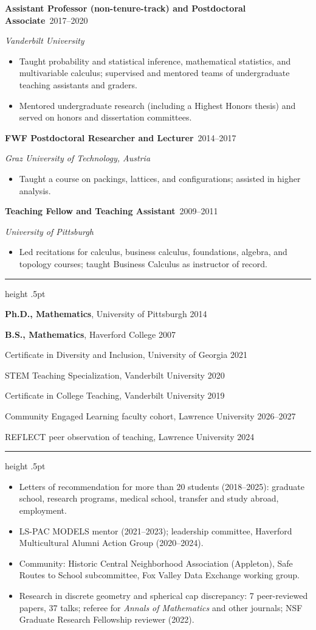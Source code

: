 \documentclass[11pt]{article}
\newcommand{\sect}[1]{\par\vspace{7pt}{\large\bfseries #1}\par\vspace{1pt}%
  {\color{rule}\hrule height .5pt}\vspace{4pt}}
\newcommand{\role}[3]{\par\vspace{3pt}\textbf{#1}\ \hfill\mbox{#3}\par   %
  {\itshape #2}\par}
\begin{document}
\role{Assistant Professor (non-tenure-track) and Postdoctoral Associate}{Vanderbilt University}{2017--2020}
\begin{itemize}
  \item Taught probability and statistical inference, mathematical statistics, and multivariable calculus;
        supervised and mentored teams of undergraduate teaching assistants and graders.
  \item Mentored undergraduate research (including a Highest Honors thesis) and served on honors and
        dissertation committees.
\end{itemize}
\role{FWF Postdoctoral Researcher and Lecturer}{Graz University of Technology, Austria}{2014--2017}
\begin{itemize}
  \item Taught a course on packings, lattices, and configurations; assisted in higher analysis.
\end{itemize}
\role{Teaching Fellow and Teaching Assistant}{University of Pittsburgh}{2009--2011}
\begin{itemize}
  \item Led recitations for calculus, business calculus, foundations, algebra, and topology courses; taught
        Business Calculus as instructor of record.
\end{itemize}

\sect{Education and Certificates}
\textbf{Ph.D., Mathematics}, University of Pittsburgh \hfill 2014\par
\textbf{B.S., Mathematics}, Haverford College \hfill 2007\par\vspace{3pt}
Certificate in Diversity and Inclusion, University of Georgia \hfill 2021\par
STEM Teaching Specialization, Vanderbilt University \hfill 2020\par
Certificate in College Teaching, Vanderbilt University \hfill 2019\par
Community Engaged Learning faculty cohort, Lawrence University \hfill 2026--2027\par
REFLECT peer observation of teaching, Lawrence University \hfill 2024

\sect{Mentoring, Service, and Scholarship}
\begin{itemize}
  \item Letters of recommendation for more than 20 students (2018--2025): graduate school, research programs,
        medical school, transfer and study abroad, employment.
  \item LS-PAC MODELS mentor (2021--2023); leadership committee, Haverford Multicultural Alumni Action
        Group (2020--2024).
  \item Community: Historic Central Neighborhood Association (Appleton), Safe Routes to School subcommittee,
        Fox Valley Data Exchange working group.
  \item Research in discrete geometry and spherical cap discrepancy: 7 peer-reviewed papers, 37 talks; referee for \emph{Annals of
        Mathematics} and other journals; NSF Graduate Research Fellowship reviewer (2022).
\end{itemize}
\end{document}
